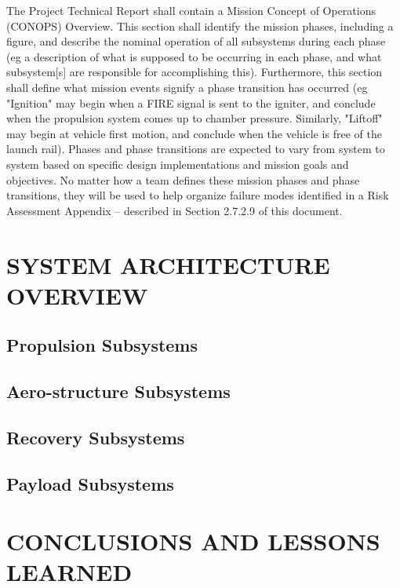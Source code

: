 \documentclass[]{aiaa-tc}%
\begin{document}
The Project Technical Report shall contain a Mission Concept of Operations (CONOPS) Overview. This section shall identify the mission phases, including a figure, and describe the nominal operation of all subsystems during each phase (eg a description of what is supposed to be occurring in each phase, and what subsystem[s] are responsible for accomplishing this). Furthermore, this section shall define what mission events signify a phase transition has occurred (eg "Ignition" may begin when a FIRE signal is sent to the igniter, and conclude when the propulsion system comes up to chamber pressure. Similarly, "Liftoff" may begin at vehicle first motion, and conclude when the vehicle is free of the launch rail). Phases and phase transitions are expected to vary from system to system based on specific design implementations and mission goals and objectives. No matter how a team defines these mission phases and phase transitions, they will be used to help organize failure modes identified in a Risk Assessment Appendix – described in Section 2.7.2.9 of this document.


\section{SYSTEM ARCHITECTURE OVERVIEW}

\subsection{Propulsion Subsystems}
\subsection{Aero-structure Subsystems}



\subsection{Recovery Subsystems}

\subsection{Payload Subsystems}







\section{CONCLUSIONS AND LESSONS LEARNED}
\end{document}
